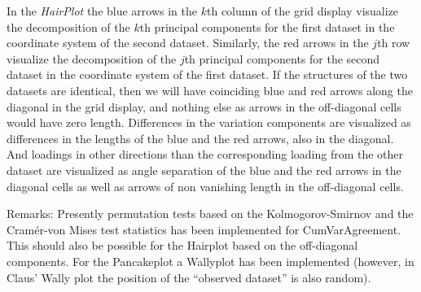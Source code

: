 \documentclass[titlepage,11pt,twoside]{article}
\begin{document}
In the \emph{HairPlot} the blue arrows in the $k$th column of the grid display visualize the decomposition of the $k$th principal components for the first dataset in the coordinate system of the second dataset. Similarly, the red arrows in the $j$th row visualize the decomposition of the $j$th principal components for the second dataset in the coordinate system of the first dataset. If the structures of the two datasets are identical, then we will have coinciding blue and red arrows along the diagonal in the grid display, and nothing else as arrows in the off-diagonal cells would have zero length. Differences in the variation components are visualized as differences in the lengths of the blue and the red arrows, also in the diagonal. And loadings in other directions than the corresponding loading from the other dataset are visualized as angle separation of the blue and the red arrows in the diagonal cells as well as arrows of non vanishing length in the off-diagonal cells.



\bigskip

Remarks: Presently permutation tests based on the Kolmogorov-Smirnov and the Cram\'er-von Mises test statistics has been implemented for CumVarAgreement. This should also be possible for the Hairplot based on the off-diagonal components. For the Pancakeplot a Wallyplot has been implemented (however, in Claus' Wally plot the position of the ``observed dataset'' is also random).

\bigskip
\end{document}
